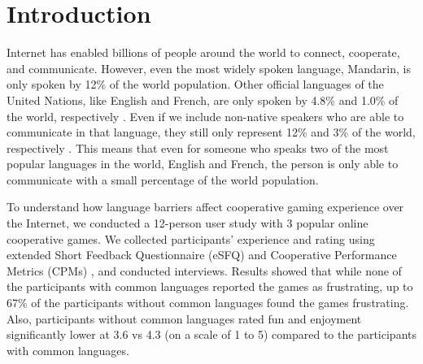 \section{Introduction}

Internet has enabled billions of people around the world to connect, cooperate, and communicate. However, even the most widely spoken language, Mandarin, is only spoken by 12\% of the world population. 
Other official languages of the United Nations, like English and French, are only spoken by 4.8\% and 1.0\% of the world, respectively \cite{Britannica Encyclopedia, http://www.britannica.com/EBchecked/topic/329791/language/292862/Most-widely-spoken-languages}. 
Even if we include non-native speakers who are able to communicate in that language, they still only represent 12\% and 3\% of the world, respectively \cite{http://en.wikipedia.org/wiki/List_of_languages_by_total_number_of_speakers, http://www.diplomatie.gouv.fr/en/french-foreign-policy-1/promoting-francophony/the-status-of-french-in-the-world/}. This means that even for someone who speaks two of the most popular languages in the world, English and French, the person is only able to communicate with a small percentage of the world population.

To understand how language barriers affect cooperative gaming experience over the Internet, we conducted a 12-person user study with 3 popular online cooperative games. We collected participants' experience and rating using extended Short Feedback Questionnaire (eSFQ) \cite{eSFQ} and Cooperative Performance Metrics (CPMs) \cite{CPMs}, and conducted interviews. Results showed that while none of the participants with common languages reported the games as frustrating, up to 67\% of the participants without common languages found the games frustrating. Also, participants without common languages rated fun and enjoyment significantly lower at 3.6 vs 4.3 (on a scale of 1 to 5) compared to the participants with common languages. 

%
%

